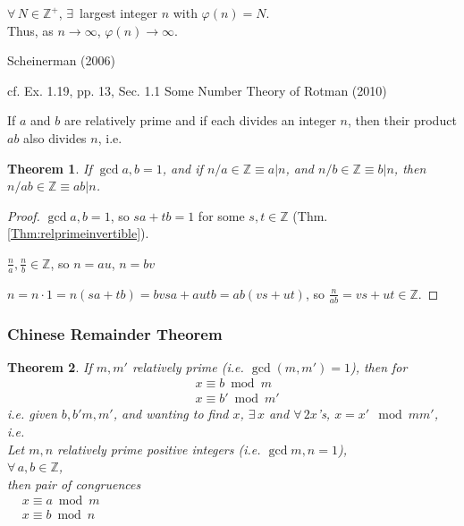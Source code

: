 \documentclass[10pt]{amsart}
\newtheorem{theorem}{Theorem}
\newcommand{\exercisehead}[1]
  { \smallskip
   \noindent{\small\bf Exercise #1.}
  }
\begin{document}
\begin{multicols*}{2}
$\forall \, N \in \mathbb{Z}^+$, $\exists \, $ largest integer $n$ with $\varphi(n) = N$.  \\
Thus, as $n\to \infty$, $\varphi(n) \to \infty$.  







Scheinerman (2006) \cite{Sche2006}

cf. Ex. 1.19, pp. 13, Sec. 1.1 Some Number Theory of Rotman (2010) \cite{JRotman2010}
\exercisehead{1.19}
If $a$ and $b$ are relatively prime and if each divides an integer $n$, then their product $ab$ also divides $n$, i.e. 
\begin{theorem}\label{Thm:relprimeproddivisible}
	If $\gcd{a,b}=1$, and if $n/a \in \mathbb{Z} \equiv a | n$, and $n/b \in \mathbb{Z} \equiv b | n$, then $n/ab \in \mathbb{Z} \equiv ab | n$.  
\end{theorem}
\begin{proof}
	$\gcd{a,b}=1$, so $sa + tb= 1$ for some $s,t \in \mathbb{Z}$ (Thm. \ref{Thm:relprimeinvertible}).  
	
	$\frac{n}{a}, \frac{n}{b} \in \mathbb{Z}$, so $n=au$, $n=bv$  
	
	$n = n\cdot 1 = n(sa+tb) = bvsa + autb = ab(vs + ut)$, so $\frac{n}{ab} = vs + ut \in \mathbb{Z}$.  
	\end{proof}

\subsubsection{Chinese Remainder Theorem}

\begin{theorem}
	If $m,m'$ relatively prime (i.e. $\gcd(m,m')=1$), then for 
\[
\begin{aligned}
	& x \equiv b \bmod{m} \\ 
	& x\equiv b'\bmod{m'}
\end{aligned}
\]
i.e. given $b,b'm,m'$, and wanting to find $x$, 
$\exists \, x$ and $\forall \, 2 x$'s, $x=x'\mod{mm'}$, i.e.  \\  

  Let $m,n$ relatively prime positive integers (i.e. $\gcd{m,n}=1$), \\
  $\forall \, a,b\in \mathbb{Z}$, \\
  then pair of congruences \\
  $\begin{aligned}
  & x \equiv a\bmod{m} \\
  & x \equiv b\bmod{n} 
  \end{aligned}$
 

\end{theorem}
\end{multicols*}
\end{document}
